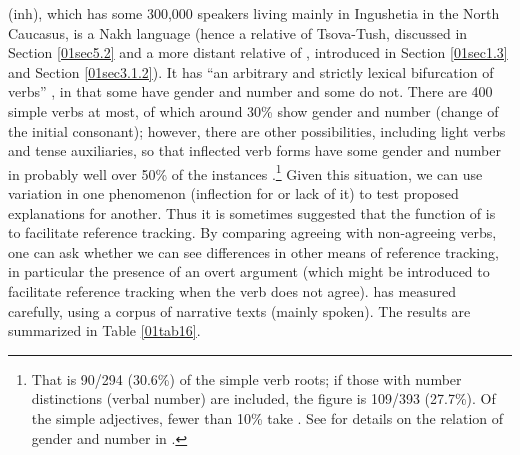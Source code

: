 \documentclass[output=paper,colorlinks,citecolor=brown]{langscibook}
\begin{document}
 (inh), which has some 300,000 speakers living mainly in Ingushetia in the North Caucasus, is a Nakh language (hence a relative of Tsova-Tush, discussed in Section \ref{01sec5.2} and a more distant relative of , introduced in Section \ref{01sec1.3} and Section \ref{01sec3.1.2}). It has ``an arbitrary and strictly lexical bifurcation of verbs'' \citep[845]{nichols2018}, in that some have gender and number  and some do not. There are 400 simple verbs at most, of which around 30\% show gender and number  (change of the initial consonant); however, there are other possibilities, including light verbs and tense auxiliaries, so that inflected verb forms have some gender and number  in probably well over 50\% of the instances \citep[141n63, 235]{nichols2011}.\footnote{That is 90/294 (30.6\%) of the simple verb roots; if those with number distinctions (verbal number) are included, the figure is 109/393 (27.7\%). Of the simple adjectives, fewer than 10\% take  \citep[141]{nichols2011}. See \citet[141--145]{nichols2011} for details on the relation of gender and number in .} Given this situation, we can use variation in one phenomenon (inflection for  or lack of it) to test proposed explanations for another. Thus it is sometimes suggested that the function of  is to facilitate reference tracking. By comparing agreeing with non-agreeing verbs, one can ask whether we can see differences in other means of reference tracking, in particular the presence of an overt argument (which might be introduced to facilitate reference tracking when the verb does not agree). \citet{nichols2018} has measured carefully, using a corpus of narrative texts (mainly spoken). The results are summarized in Table \ref{01tab16}.
\end{document}
